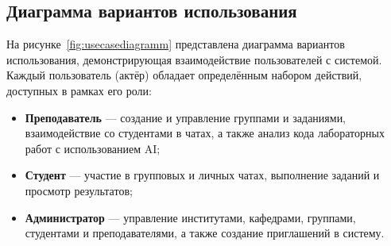 \subsection{Диаграмма вариантов использования}

На рисунке~\ref{fig:usecasediagramm} представлена диаграмма вариантов использования, демонстрирующая взаимодействие пользователей с системой. Каждый пользователь (актёр) обладает определённым набором действий, доступных в рамках его роли:

\begin{itemize}
  \item \textbf{Преподаватель} — создание и управление группами и заданиями, взаимодействие со студентами в чатах, а также анализ кода лабораторных работ с использованием AI;
  \item \textbf{Студент} — участие в групповых и личных чатах, выполнение заданий и просмотр результатов;
  \item \textbf{Администратор} — управление институтами, кафедрами, группами, студентами и преподавателями, а также создание приглашений в систему.
\end{itemize}
